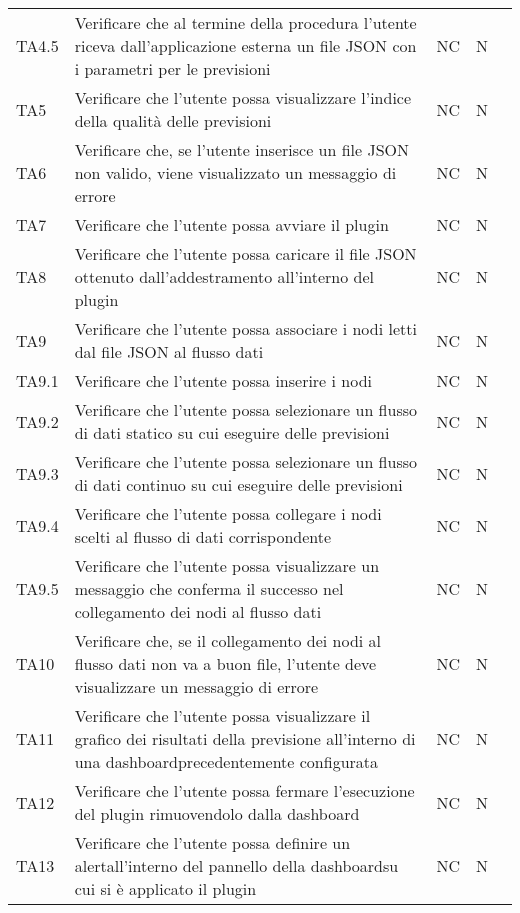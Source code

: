 \begin{longtable} {
		>{\centering}p{15mm} 
		>{\centering}p{79.5mm}
		>{\centering}p{15mm} 
		>{\centering}p{15mm}
		>{}p{0mm}}
	TA4.5 & Verificare che al termine della procedura l'utente riceva dall'applicazione esterna un file JSON con i parametri per le previsioni & NC & N  &\TBstrut \\ [2mm]
	TA5 & Verificare che l'utente possa visualizzare l'indice della qualità delle previsioni & NC & N  &\TBstrut \\ [2mm]
	TA6 & Verificare che, se l'utente inserisce un file JSON non valido, viene visualizzato un messaggio di errore & NC & N  &\TBstrut \\ [2mm]
	TA7 & Verificare che l'utente possa avviare il plugin & NC & N  &\TBstrut \\ [2mm]
	TA8 & Verificare che l'utente possa caricare il file JSON ottenuto dall'addestramento all'interno del plugin & NC & N  &\TBstrut \\ [2mm]
	TA9 & Verificare che l'utente possa associare i nodi letti dal file JSON al flusso dati & NC & N  &\TBstrut \\ [2mm]
	TA9.1 & Verificare che l'utente possa inserire i nodi & NC & N  &\TBstrut \\ [2mm]
	TA9.2 & Verificare che l'utente possa selezionare un flusso di dati statico su cui eseguire delle previsioni & NC & N  &\TBstrut \\ [2mm]
	TA9.3 & Verificare che l'utente possa selezionare un flusso di dati continuo su cui eseguire delle previsioni & NC & N  &\TBstrut \\ [2mm]
	TA9.4 & Verificare che l'utente possa collegare i nodi scelti al flusso di dati corrispondente & NC & N  &\TBstrut \\ [2mm]
	TA9.5 & Verificare che l'utente possa visualizzare un messaggio che conferma il successo nel collegamento dei nodi al flusso dati & NC & N  &\TBstrut \\ [2mm]
	TA10 & Verificare che, se il collegamento dei nodi al flusso dati non va a buon file, l'utente deve visualizzare un messaggio di errore & NC & N  &\TBstrut \\ [2mm]
	TA11 & Verificare che l'utente possa visualizzare il grafico dei risultati della previsione all'interno di una dashboard\glosp precedentemente configurata & NC & N  &\TBstrut \\ [2mm]
	TA12 & Verificare che l'utente possa fermare l'esecuzione del plugin rimuovendolo dalla dashboard\glo & NC & N  &\TBstrut \\ [2mm]
	TA13 & Verificare che l'utente possa definire un alert\glosp all'interno del pannello della dashboard\glosp su cui si è applicato il plugin & NC & N  &\TBstrut \\ [2mm]

\end{longtable}
